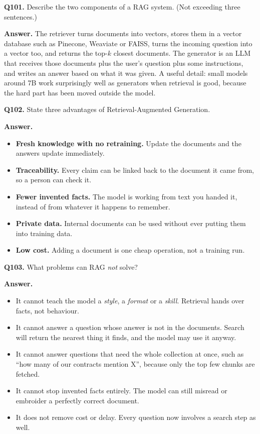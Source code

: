 \documentclass[11pt]{article}
\begin{document}
\medskip
\textbf{Q101.} Describe the two components of a RAG system. (Not exceeding three sentences.)

\textbf{Answer.} The retriever turns documents into vectors, stores them in a vector database
such as Pinecone, Weaviate or FAISS, turns the incoming question into a vector too, and returns
the top-$k$ closest documents. The generator is an LLM that receives those documents plus the
user's question plus some instructions, and writes an answer based on what it was given. A
useful detail: small models around 7B work surprisingly well as generators when retrieval is
good, because the hard part has been moved outside the model.

\medskip
\textbf{Q102.} State three advantages of Retrieval-Augmented Generation.

\textbf{Answer.}
\begin{itemize}
  \item \textbf{Fresh knowledge with no retraining.} Update the documents and the answers update immediately.
  \item \textbf{Traceability.} Every claim can be linked back to the document it came from, so a person can check it.
  \item \textbf{Fewer invented facts.} The model is working from text you handed it, instead of from whatever it happens to remember.
  \item \textbf{Private data.} Internal documents can be used without ever putting them into training data.
  \item \textbf{Low cost.} Adding a document is one cheap operation, not a training run.
\end{itemize}

\medskip
\textbf{Q103.} What problems can RAG \emph{not} solve?

\textbf{Answer.}
\begin{itemize}
  \item It cannot teach the model a \emph{style}, a \emph{format} or a \emph{skill}. Retrieval hands over facts, not behaviour.
  \item It cannot answer a question whose answer is not in the documents. Search will return the nearest thing it finds, and the model may use it anyway.
  \item It cannot answer questions that need the whole collection at once, such as ``how many of our contracts mention X'', because only the top few chunks are fetched.
  \item It cannot stop invented facts entirely. The model can still misread or embroider a perfectly correct document.
  \item It does not remove cost or delay. Every question now involves a search step as well.
\end{itemize}
\end{document}
